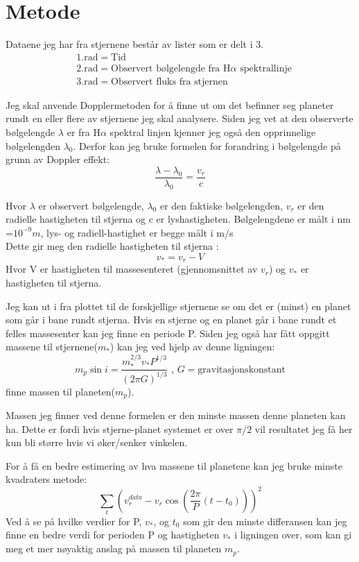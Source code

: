 \documentclass[12pt,preprint]{aastex6}
\begin{document}
\section{Metode}
Dataene jeg har fra stjernene består av lister som er delt i 3. 
\begin{align*}
&1.\text{rad} = \text{Tid}\\
&2.\text{rad} = \text{Observert bølgelengde fra H}\alpha \text{ spektrallinje}\\
&3.\text{rad} = \text{Observert fluks fra stjernen}
\end{align*}

Jeg skal anvende Dopplermetoden for å finne ut om det befinner seg planeter rundt en eller flere av stjernene jeg skal analysere. Siden jeg vet at den observerte bølgelengde $\lambda$ er fra H$\alpha$ spektral linjen kjenner jeg også den opprinnelige bølgelengden $\lambda_0$. Derfor kan jeg bruke  formelen for forandring i bølgelengde på grunn av Doppler effekt:
$$\frac{\lambda - \lambda_0}{\lambda_0} = \frac{v_r}{c}$$

Hvor $\lambda$ er observert bølgelengde, $\lambda_0$ er den faktiske bølgelengden, $v_r$ er den radielle hastigheten til stjerna og c er lyshastigheten. Bølgelengdene er målt i nm =$10^{-9}m$, lys- og radiell-hastighet er begge målt i m/s \\
Dette gir meg den radielle hastigheten til stjerna :
$$v_*=v_r - V$$
Hvor V er hastigheten til massesenteret (gjennomsnittet av $v_r$) og $v_*$ er hastigheten til stjerna. 

Jeg kan ut i fra plottet til de forskjellige stjernene se om det er (minst) en planet som går i bane rundt stjerna. Hvis en stjerne og en planet går i bane rundt et felles massesenter kan jeg finne en periode P. Siden jeg også har fått oppgitt massene til stjernene($m_*$) kan jeg ved hjelp av denne ligningen:
$$ m_p\sin i = \frac{m_*^{2/3}v_*P^{1/3}}{(2\pi G)^{1/3}} \text{ , } G=\text{gravitasjonskonstant}$$
finne massen til planeten($m_p$).

Massen jeg finner ved denne formelen er den minste massen denne planeten kan ha. Dette er fordi hvis stjerne-planet systemet er over $\pi /2$ vil resultatet jeg få her kun bli større hvis vi øker/senker vinkelen. 

For å få en bedre estimering av hva massene til planetene kan jeg bruke minste kvadraters metode: 
$$\sum_{t}(v_r^{data}- v_r\cos(\frac{2\pi}{P}(t-t_0)))^2$$
Ved å se på hvilke verdier for P, $v_*$, og $t_0$ som gir den minste differansen kan jeg finne en bedre verdi for perioden P og hastigheten $v_*$ i ligningen over, som kan gi meg et mer nøyaktig anslag på massen til planeten $m_p$. \\
\end{document}
